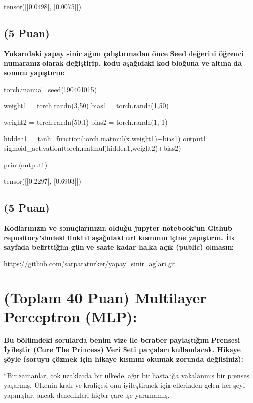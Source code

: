 \documentclass[11pt]{article}
\begin{document}
tensor([[0.0498],
        [0.0075]])

\subsection{(5 Puan)} \textbf{Yukarıdaki yapay sinir ağını çalıştırmadan önce Seed değerini öğrenci numaranız olarak değiştirip, kodu aşağıdaki kod bloğuna ve altına da sonucu yapıştırın:}

\begin{python}
torch.manual_seed(190401015)

weight1 = torch.randn(3,50) 
bias1 = torch.randn(1,50) 

weight2 = torch.randn(50,1)
bias2 = torch.randn(1, 1)

hidden1 = tanh_function(torch.matmul(x,weight1)+bias1)
output1 = sigmoid_activation(torch.matmul(hidden1,weight2)+bias2)

print(output1)
\end{python}

tensor([[0.2297],
        [0.6903]])

\subsection{(5 Puan)} \textbf{Kodlarınızın ve sonuçlarınızın olduğu jupyter notebook'un Github repository'sindeki linkini aşağıdaki url kısmının içine yapıştırın. İlk sayfada belirttiğim gün ve saate kadar halka açık (public) olmasın:}

\url{https://github.com/sarpataturker/yapay_sinir_aglari.git}

\section{(Toplam 40 Puan) Multilayer Perceptron (MLP):} 
\textbf{Bu bölümdeki sorularda benim vize ile beraber paylaştığım Prensesi İyileştir (Cure The Princess) Veri Seti parçaları kullanılacak. Hikaye şöyle (soruyu çözmek için hikaye kısmını okumak zorunda değilsiniz):} 

``Bir zamanlar, çok uzaklarda bir ülkede, ağır bir hastalığa yakalanmış bir prenses yaşarmış. Ülkenin kralı ve kraliçesi onu iyileştirmek için ellerinden gelen her şeyi yapmışlar, ancak denedikleri hiçbir çare işe yaramamış.
\end{document}
